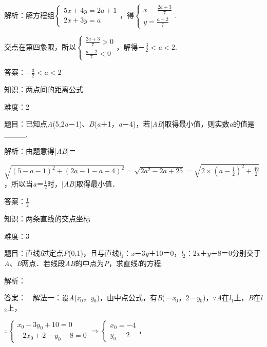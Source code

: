 \documentclass{article} %
\begin{document}
解析：解方程组$\left\{\begin{array}{l} 5x+4y=2a+1\\ 2x+3y=a \end{array}\right.$，得$\left\{\begin{array}{l} x=\frac{2a+3}{7}\\ y=\frac{a-2}{7} \end{array}\right.$.

交点在第四象限，所以$\left\{\begin{array}{l} \frac{2a+3}{7}>0\\ \frac{a-2}{7}<0 \end{array}\right.$，解得－$\frac{3}{2}\mathrm{<}$\textit{a}$\mathrm{<}$2.

答案：$-\frac{3}{2}<a<2$



知识：两点间的距离公式

难度：2

题目：已知点\textit{A}(5,2\textit{a}－1)、\textit{B}(\textit{a}＋1，\textit{a}－4)，若|\textit{AB}|取得最小值，则实数\textit{a}的值是\_\_\_\_.

解析：由题意得|\textit{AB}|＝

$\sqrt{(5-a-1)^2+(2a-1-a+4)^2}=\sqrt{2a^2-2a+25}=\sqrt{2\times(a-\frac{1}{2})^2+\frac{49}{2}}$，所以当\textit{a}＝$\frac{1}{2}$时，|\textit{AB}|取得最小值．

答案：$\frac{1}{2}$


知识：两条直线的交点坐标

难度：3

题目：直线\textit{l}过定点\textit{P}(0,1)，且与直线\textit{l}${}_{1}$：\textit{x}－3\textit{y}＋10＝0，\textit{l}${}_{2}$：2\textit{x}＋\textit{y}－8＝0分别交于\textit{A}、\textit{B}两点．若线段\textit{AB}的中点为\textit{P}，求直线\textit{l}的方程.

解析：

答案：　解法一：设\textit{A}(\textit{x}${}_{0}$，\textit{y}${}_{0}$)，由中点公式，有\textit{B}(－\textit{x}${}_{0}$，2－\textit{y}${}_{0}$)，$\mathrm{\because}$\textit{A}在\textit{l}${}_{1}$上，\textit{B}在\textit{l}${}_{2}$上，

$\mathrm{\therefore}\left\{\begin{array}{l} x_0-3y_0+10=0\\	-2x_0+2-y_0-8=0 \end{array}\right.\Rightarrow \left\{\begin{array}{l} x_0=-4\\ y_0=2 \end{array}\right.$，
\end{document}
